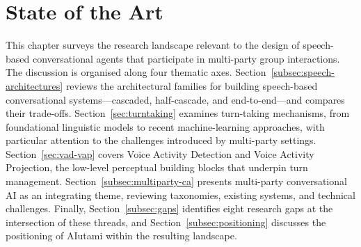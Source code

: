 
\section{State of the Art}
\label{sec:sota}

This chapter surveys the research landscape relevant to the design of
speech-based conversational agents that participate in multi-party group
interactions.  The discussion is organised along four thematic axes.
Section~\ref{subsec:speech-architectures} reviews the architectural
families for building speech-based conversational systems---cascaded,
half-cascade, and end-to-end---and compares their trade-offs.
Section~\ref{sec:turntaking} examines turn-taking mechanisms, from
foundational linguistic models to recent machine-learning approaches,
with particular attention to the challenges introduced by multi-party
settings.  Section~\ref{sec:vad-vap} covers Voice Activity Detection and
Voice Activity Projection, the low-level perceptual building blocks that
underpin turn management.  Section~\ref{subsec:multiparty-ca} presents
multi-party conversational AI as an integrating theme, reviewing
taxonomies, existing systems, and technical challenges.  Finally,
Section~\ref{subsec:gaps} identifies eight research gaps at the
intersection of these threads, and Section~\ref{subsec:positioning}
discusses the positioning of AIutami within the resulting landscape.






